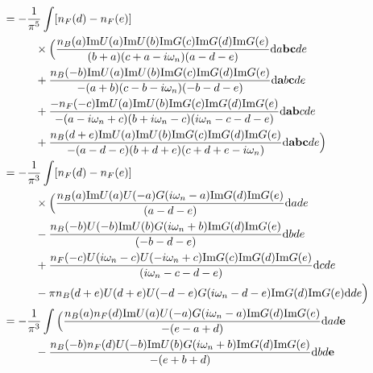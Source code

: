 \documentclass[12pt,a4paper]{scrartcl}
\numberwithin{equation}{section}
\begin{document}
\begin{align}
&= -\frac{1}{\pi^5} \int  [n_F(d)-n_F(e)] \nonumber\\
&\hspace*{1cm} \times \Big( 
                \frac{n_B(a)\mathrm{Im}U(a)\mathrm{Im}U(b)\mathrm{Im}G(c)\mathrm{Im}G(d)\mathrm{Im}G(e)}{(b+a)(c+ a-i\omega_n )(a-d-e) } \mathrm{d}a\mathbf{bc}de\nonumber \\
&\hspace*{1cm} +\frac{n_B(-b)\mathrm{Im}U(a)\mathrm{Im}U(b)\mathrm{Im}G(c)\mathrm{Im}G(d)\mathrm{Im}G(e)}{ -(a+b)(c -b-i\omega_n )(-b-d-e) } \mathrm{d}\textbf{a}b\textbf{c}de\nonumber \\
&\hspace*{1cm} +\frac{-n_F(-c)\mathrm{Im}U(a)\mathrm{Im}U(b)\mathrm{Im}G(c)\mathrm{Im}G(d)\mathrm{Im}G(e)}{ -(a-i\omega_n+c)(b+i\omega_n-c)(i\omega_n-c-d-e) }\mathrm{d}\textbf{ab}cde \nonumber \\
&\hspace*{1cm} +\frac{n_B(d+e)\mathrm{Im}U(a)\mathrm{Im}U(b)\mathrm{Im}G(c)\mathrm{Im}G(d)\mathrm{Im}G(e)}{ -(a-d-e)(b+d+e)(c+ d+e-i\omega_n ) } \mathrm{d}\textbf{abc}de
    \Big)  \\%
&= -\frac{1}{\pi^3} \int  [n_F(d)-n_F(e)] \nonumber\\
&\hspace*{1cm} \times \Big( 
                \frac{n_B(a)\mathrm{Im}U(a)U(-a)G(i\omega_n-a)\mathrm{Im}G(d)\mathrm{Im}G(e)}{(a-d-e) } \mathrm{d}ade\nonumber \\
&\hspace*{1cm} -\frac{n_B(-b)U(-b)\mathrm{Im}U(b)G(i\omega_n+b)\mathrm{Im}G(d)\mathrm{Im}G(e)}{ (-b-d-e) } \mathrm{d}bde\nonumber \\
&\hspace*{1cm} +\frac{n_F(-c)U(i\omega_n-c)U(-i\omega_n+c)\mathrm{Im}G(c)\mathrm{Im}G(d)\mathrm{Im}G(e)}{(i\omega_n-c-d-e) }\mathrm{d}cde \nonumber \\
&\hspace*{1cm} -\pi n_B(d+e)U(d+e)U(-d-e)G(i\omega_n-d-e)\mathrm{Im}G(d)\mathrm{Im}G(e)  \mathrm{d}de
    \Big)  \\ 
&= -\frac{1}{\pi^3} \int \Big( 
                \frac{n_B(a)n_F(d)\mathrm{Im}U(a)U(-a)G(i\omega_n-a)\mathrm{Im}G(d)\mathrm{Im}G(e)}{-(e-a+d) } \mathrm{d}ad\textbf{e}\nonumber \\
&\hspace*{1cm} -\frac{n_B(-b)n_F(d)U(-b)\mathrm{Im}U(b)G(i\omega_n+b)\mathrm{Im}G(d)\mathrm{Im}G(e)}{ -(e+b+d) } \mathrm{d}bd\textbf{e}\nonumber \\

\end{align}
\end{document}
